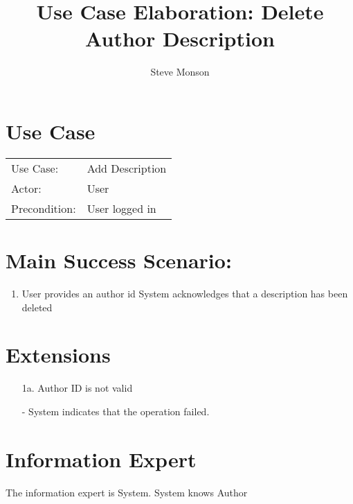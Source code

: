 \documentclass{article}
\title{Use Case Elaboration: Delete Author Description}
\author{ Steve Monson }
\begin{document}
\maketitle


\section*{Use Case}
\begin{tabular}{l l}
Use Case:     & Add Description\\
Actor:        & User\\
Precondition: & User logged in\\
\end{tabular}


\section*{Main Success Scenario:}

\begin{enumerate}
    \item User provides an author id 
    \itme System acknowledges that a description has been deleted
 
\end{enumerate}

\section*{Extensions}

\begin{itemize}
    \item [1a.] Author ID is not valid
    
         - System indicates that the operation failed.
                            
\end{itemize}


\section*{Information Expert}
The information expert is System. System knows Author
\end{document}
